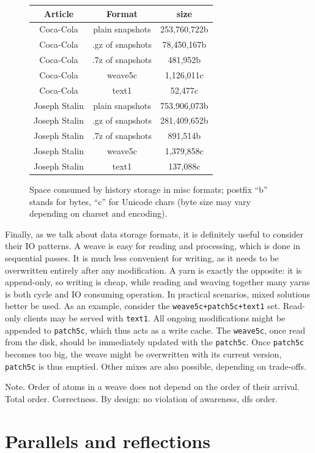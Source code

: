 \documentclass{acm_proc_article-sp}
\begin{document}
\begin{figure} \label{tab:sizes}
\begin{tabular}{|c|c|c|}
\hline
Article & Format & size \\
\hline
Coca-Cola & plain snapshots & 253,760,722b \\
Coca-Cola & .gz of snapshots & 78,450,167b \\
Coca-Cola & .7z of snapshots & 481,952b \\
Coca-Cola & weave5c & 1,126,011c \\
Coca-Cola & text1 & 52,477c \\
Joseph Stalin & plain snapshots & 753,906,073b \\
Joseph Stalin & .gz of snapshots & 281,409,652b \\
Joseph Stalin & .7z of snapshots & 891,514b\\
Joseph Stalin & weave5c & 1,379,858c \\
Joseph Stalin & text1 & 137,088c \\
\hline
\end{tabular}
\caption{Space consumed by history storage in misc formats; postfix ``b'' stands for bytes, ``c'' for Unicode chars (byte size may vary depending on charset and encoding).}
\end{figure}

Finally, as we talk about data storage formats, it is
definitely useful to consider their IO patterns. A weave
is easy for reading and processing, which is done in
sequential passes. It is much less convenient for writing,
as it needs to be overwritten entirely after any
modification. A yarn is exactly the opposite: it is
append-only, so writing is cheap, while reading and
weaving together many yarns is both cycle and IO
consuming operation.
In practical scenarios, mixed solutions better be used.
As an example, consider the {\tt weave5c+patch5c+text1} set.
Read-only clients may be served with {\tt text1}. All
ongoing modifications might be appended to {\tt patch5c},
which thus acts as a write cache. The {\tt weave5c}, once
read from the disk, should be immediately  updated with
the {\tt patch5c}. Once {\tt patch5c} becomes too
big, the weave might be overwritten with its current
version, {\tt patch5c} is thus emptied. Other mixes are
also possible, depending on trade-offs.

Note. Order of atoms in a weave does not depend on the order
of their arrival. Total order. Correctness.
By design: no violation of awareness, dfs order.

\section{Parallels and reflections}
\end{document}

